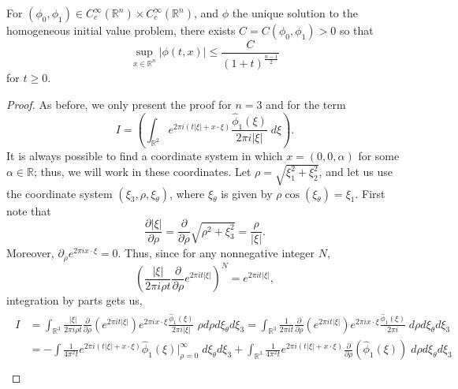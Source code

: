 \documentclass{article}
\begin{document}
\begin{theorem}
	For $(\phi_0, \phi_1) \in C_c^{\infty}(\mathbb{R}^n) \times C_c^{\infty}(\mathbb{R}^n)$, and $\phi$ the unique solution to the homogeneous initial value problem, there exists $C = C(\phi_0, \phi_1) > 0$ so that
	\begin{equation*}
		\sup_{x \in \mathbb{R}^n}|\phi(t,x)| \leq \frac{C}{(1 + t)^{\frac{n-1}{2}}}
	\end{equation*}
	for $t\geq 0$. 
\end{theorem}
\begin{proof}
	As before, we only present the proof for $n = 3$ and for the term 
	\begin{equation*}
		I = \left(\int_{\mathbb{R}^{2}}e^{2\pi i (t |\xi| + x \cdot \xi)}\frac{\hat{\phi}_{1}(\xi)}{2\pi i |\xi|}\;d\xi\right).
	\end{equation*}
	It is always possible to find a coordinate system in which $x = (0,0,\alpha)$ for some $\alpha \in \mathbb{R}$; thus, we will work in these coordinates. Let $\rho = \sqrt{\xi_{1}^{2} + \xi_{2}^{2}}$, and let us use the coordinate system $(\xi_{3}, \rho, \xi_{\theta})$, where $\xi_{\theta}$ is given by $\rho\cos(\xi_{\theta}) = \xi_{1}$. First note that  
	\begin{equation*}
		\frac{\partial |\xi|}{\partial \rho} = \frac{\partial}{\partial \rho}\sqrt{\rho^{2} + \xi_{3}^{2}} = \frac{\rho}{|\xi|}. 
	\end{equation*}
	Moreover, $\partial_{\rho}e^{2\pi i x \cdot \xi} = 0$. Thus, since for any nonnegative integer $N$,  
	\begin{equation*}
		\left(\frac{|\xi|}{2\pi i \rho t}\frac{\partial}{\partial \rho}e^{2\pi i t|\xi|}\right)^{N} = e^{2\pi i t|\xi|}, 
	\end{equation*}
	integration by parts gets us, 
	\begin{align*}
		\begin{split}
			I &= \int_{\mathbb{R}^{3}}\frac{|\xi|}{2\pi i \rho t}\frac{\partial}{\partial \rho}(e^{2\pi i t|\xi|})e^{2\pi i x \cdot \xi} \frac{\hat{\phi}_{1}(\xi)}{2\pi i |\xi|}\;\rho d\rho d\xi_{\theta}d\xi_{3} = \int_{\mathbb{R}^{3}}\frac{1}{2\pi i t}\frac{\partial}{\partial \rho}(e^{2\pi i t|\xi|})e^{2\pi i x \cdot \xi} \frac{\hat{\phi}_{1}(\xi)}{2\pi i}\;d\rho d\xi_{\theta}d\xi_{3} \\
			&= -\int \frac{1}{4\pi^{2}t}e^{2\pi i(t|\xi| + x \cdot \xi)}\hat{\phi}_{1}(\xi)\bigg|_{\rho = 0}^{\infty}\;d\xi_{\theta}d\xi_{3} + \int_{\mathbb{R}^{3}}\frac{1}{4\pi^{2}t}e^{2\pi i (t |\xi| + x \cdot \xi)}\frac{\partial}{\partial \rho}(\hat{\phi}_{1}(\xi))\;d\rho d\xi_{\theta}d\xi_{3} \\

\end{split}
\end{align*}
\end{proof}
\end{document}
